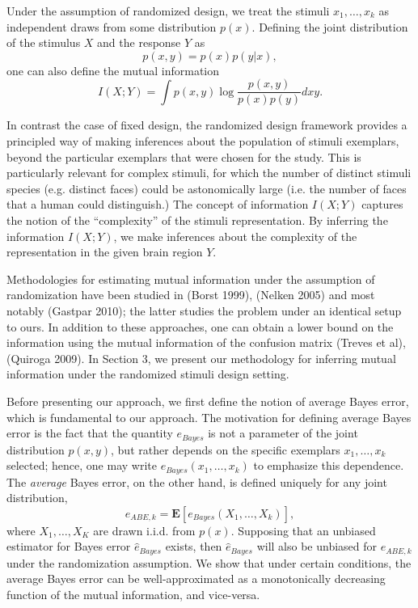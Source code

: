 \documentclass{article}
\newcommand{\E}{\textbf{E}}
\begin{document}
Under the assumption of randomized design, we treat the stimuli
$x_1,\hdots, x_k$ as independent draws from some distribution $p(x)$.
Defining the joint distribution of the stimulus $X$ and the response
$Y$ as
\[
p(x, y) = p(x) p(y|x),
\]
one can also define the mutual information
\[
I(X; Y) = \int p(x, y) \log \frac{p(x, y)}{p(x) p(y)} dxy.
\]

In contrast the case of fixed design, the randomized design framework
provides a principled way of making inferences about the population of
stimuli exemplars, beyond the particular exemplars that were chosen
for the study.  This is particularly relevant for complex stimuli, for
which the number of distinct stimuli species (e.g. distinct faces)
could be astonomically large (i.e. the number of faces that a human
could distinguish.)  The concept of information $I(X; Y)$ captures the
notion of the ``complexity'' of the stimuli representation.  By
inferring the information $I(X; Y)$, we make inferences about the
complexity of the representation in the given brain region $Y$.

Methodologies for estimating mutual information under the assumption
of randomization have been studied in (Borst 1999), (Nelken 2005) and
most notably (Gastpar 2010); the latter studies the problem under an
identical setup to ours.  In addition to these approaches, one can
obtain a lower bound on the information using the mutual information
of the confusion matrix (Treves et al), (Quiroga 2009).  In Section 3,
we present our methodology for inferring mutual information under the
randomized stimuli design setting.

Before presenting our approach, we first define the notion of average
Bayes error, which is fundamental to our approach.  The motivation for
defining average Bayes error is the fact that the quantity $e_{Bayes}$
is not a parameter of the joint distribution $p(x, y)$, but rather
depends on the specific exemplars $x_1,\hdots, x_k$ selected; hence,
one may write $e_{Bayes}(x_1,\hdots, x_k)$ to emphasize this
dependence.  The \emph{average} Bayes error, on the other hand, is
defined uniquely for any joint distribution,
\begin{equation}\label{eq:abe}
e_{ABE, k} = \E[e_{Bayes}(X_1,\hdots, X_k)],
\end{equation}
where $X_1,\hdots, X_K$ are drawn i.i.d. from $p(x)$.  Supposing that
an unbiased estimator for Bayes error $\hat{e}_{Bayes}$ exists, then
$\hat{e}_{Bayes}$ will also be unbiased for $e_{ABE, k}$ under the
randomization assumption.  We show that under certain conditions, the
average Bayes error can be well-approximated as a monotonically
decreasing function of the mutual information, and vice-versa.
\end{document}
